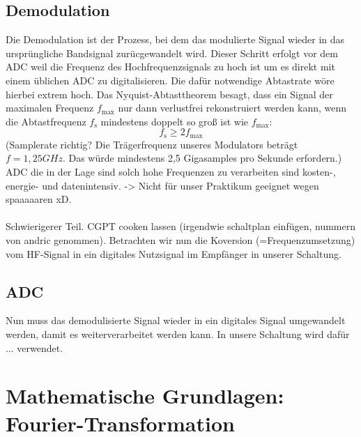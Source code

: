\subsection{Demodulation}
Die Demodulation ist der Prozess, bei dem das modulierte Signal wieder in das ursprüngliche Bandsignal zurücgewandelt wird. Dieser Schritt erfolgt
vor dem ADC weil die Frequenz des Hochfrequenzsignals zu hoch ist um es direkt mit einem üblichen ADC zu digitalisieren. Die dafür notwendige
Abtastrate wöre hierbei extrem hoch.
Das Nyquist-Abtasttheorem besagt, dass ein Signal der maximalen Frequenz $f_\mathrm{max}$ nur dann verlustfrei rekonstruiert werden kann,
wenn die Abtastfrequenz $f_\mathrm{s}$ mindestens doppelt so groß ist wie $f_\mathrm{max}$:
\begin{equation}
    f_\mathrm{s} \geq 2 f_\mathrm{max}
\end{equation}
(Samplerate richtig? Die Trägerfrequenz unseres
Modulators beträgt $f=1,25GHz$. Das würde mindestens 2,5 Gigasamples pro Sekunde erfordern.) ADC die in der Lage sind solch hohe Frequenzen
zu verarbeiten sind kosten-, energie- und datenintensiv. -> Nicht für unser Praktikum geeignet wegen spaaaaaren xD.\\
\\
Schwierigerer Teil. CGPT cooken lassen (irgendwie schaltplan einfügen, nummern von andric genommen). Betrachten wir nun die Koversion 
(=Frequenzumsetzung) vom HF-Signal in ein digitales Nutzsignal im Empfänger in unserer Schaltung. 



\subsection{ADC}
Nun muss das demodulisierte Signal wieder in ein digitales Signal umgewandelt werden, damit es weiterverarbeitet werden kann.
In unsere Schaltung wird dafür ... verwendet. 


\section{Mathematische Grundlagen: Fourier-Transformation}

